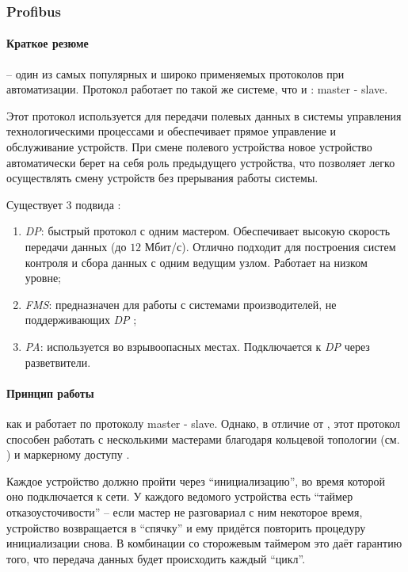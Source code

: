 \subsubsection{Profibus}\label{par:profibus}
\paragraph{Краткое резюме}
\pb -- один из самых популярных и широко применяемых протоколов при автоматизации. Протокол работает по такой же системе, что и \mb: master -  slave. 

Этот протокол используется для передачи полевых данных в системы уп\-равления технологическими процессами и обеспечивает прямое управление и обслуживание устройств. При смене полевого устройства новое устройство автоматически берет на себя роль предыдущего устройства, что позволяет легко осуществлять смену устройств без прерывания работы системы.

Существует 3 подвида \pb \cite{__2001, __2002, galloway_introduction_2012}:
\begin{enumerate}
	\item \pb \textit{DP}: быстрый протокол с одним мастером. Обеспечивает высокую скорость передачи данных (до $12$ Мбит/с). Отлично подходит для построения систем контроля и сбора данных с одним ведущим узлом. Работает на низком уровне;
	\item \pb \textit{FMS}: предназначен для работы с системами производителей, не поддерживающих \pb \textit{DP} \cite{__2001, promwad__2019-1};
	\item \pb \textit{PA}: используется во взрывоопасных местах. Подключается к \newline \pb \textit{DP} через разветвители.
\end{enumerate}
\paragraph{Принцип работы}\label{par:pb_work}
\pb как и \mb работает по протоколу master - slave. Однако, в отличие от \mb, этот протокол способен работать с несколькими мастерами благодаря кольцевой топологии (см. ) и маркерному доступу \cite{powell_profibus_2013}.

Каждое устройство должно пройти через ``инициализацию'', во время которой оно подключается к сети. У каждого ведомого устройства есть ``таймер отказоусточивости'' -- если мастер не разговариал с ним некоторое время, устройство возвращается в ``спячку'' и ему придётся повторить процедуру инициализации снова. В комбинации со сторожевым таймером это даёт гарантию того, что передача данных будет происходить каждый ``цикл''.

